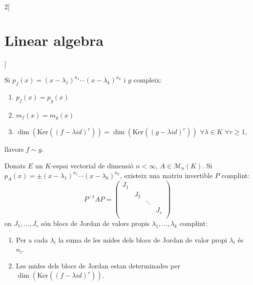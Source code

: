 \documentclass[../../../main.tex]{subfiles}
\begin{document}
\begin{multicols}{2}[\section{Linear algebra}]
\begin{theorem}
\end{theorem}
\begin{theorem}
Si $p_f(x)=(x-\lambda_1)^{n_1}\cdots(x-\lambda_k)^{n_k}$ i $g$ compleix:
\begin{enumerate}
    \item $p_f(x)=p_g(x)$
    \item $m_f(x)=m_g(x)$
    \item $\dim(\text{Ker}((f-\lambda id)^r))=\dim(\text{Ker}((g-\lambda id)^r))$ $\forall\lambda\in K$ $\forall r\geq 1$,
\end{enumerate}
llavors $f\sim g$.
\end{theorem}
\begin{prop}
Donats $E$ un $K$-espai vectorial de dimensió $n<\infty$, $A\in\mathcal{M}_n(K)$. Si $p_A(x)=\pm(x-\lambda_1)^{n_1}\cdots(x-\lambda_k)^{n_k}$, existeix una matriu invertible $P$ complint: $$P^{-1}AP=\begin{pmatrix}
J_1 & & & \\
& J_2 & & \\
& & \ddots & \\
& & & J_e \\
\end{pmatrix}$$
on $J_1,\ldots,J_e$ són blocs de Jordan de valors propis $\lambda_1,\ldots,\lambda_k$ complint:
\begin{enumerate}
    \item Per a cada $\lambda_i$ la suma de les mides dels blocs de Jordan de valor propi $\lambda_i$ és $n_i$.
    \item Les mides dels blocs de Jordan estan determinades per $\dim(\text{Ker}((f-\lambda id)^r))$.
\end{enumerate}
\end{prop}

\end{multicols}
\end{document}
